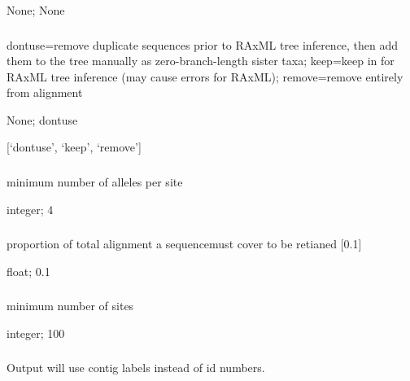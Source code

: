\documentclass[letterpaper,11pt,english]{sphinxmanual}
\begin{document}
 None;  None


\subsubsection{}
\label{\detokenize{prog_desc:duplicate-seq-duplicateseq}}
 dontuse=remove duplicate sequences prior to RAxML tree inference, then add them to the tree manually as zero-branch-length sister taxa; keep=keep in for RAxML tree inference (may cause errors for RAxML); remove=remove entirely from alignment

 None;  dontuse

 {[}‘dontuse’, ‘keep’, ‘remove’{]}


\subsubsection{}
\label{\detokenize{prog_desc:min-depth-mindepth}}
 minimum number of alleles per site

 integer;  4


\subsubsection{}
\label{\detokenize{prog_desc:min-seq-coverage-minseqcoverage}}
 proportion of total alignment a sequencemust cover to be retianed {[}0.1{]}

 float;  0.1


\subsubsection{}
\label{\detokenize{prog_desc:min-sites-minsites}}
 minimum number of sites

 integer;  100


\subsubsection{}
\label{\detokenize{prog_desc:output-contig-labels-outputcontiglabels}}
 Output will use contig labels instead of id numbers.
\end{document}
